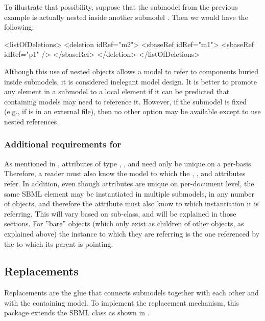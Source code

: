 To illustrate that possibility, suppose that the submodel  from
the previous example is actually nested inside another submodel
.  Then we would have the following:

\begin{example}
<listOfDeletions>
  <deletion idRef="m2">
    <sbaseRef idRef="m1">
      <sbaseRef idRef="p1" />
    </sbaseRef>
  </deletion>
</listOfDeletions>
\end{example}

Although this use of nested \SBaseRef objects allows a model to refer to
components buried inside submodels, it is considered inelegant model
design.  It is better to promote any element in a submodel to a local
element if it can be predicted that containing models may need to
reference it.  However, if the submodel is fixed (e.g., if is in an
external file), then no other option may be available except to use
nested references.

\subsubsection{Additional requirements for }

As mentioned in , attributes of type ,
, and  need only be unique on a
per-\Model basis.  Therefore, a reader must also know the model to which
the , , and  attributes
refer.  In addition, even though  attributes are unique
on per-document level, the same SBML element may be instantiated in
multiple submodels, in any number of \Model objects, and therefore the
 attribute must also know to which \Model instantiation
it is referring.  This will vary based on \SBaseRef sub-class, and will
be explained in those sections.  For ''bare'' \SBaseRef objects (which
only exist as children of other \SBaseRef objects, as explained above)
the \Model instance to which they are referring is the one referenced by
the \Submodel to which its parent is pointing.


\subsection{Replacements}
\label{replacements}
\label{extenced-sbase-class}

Replacements are the glue that connects submodels together with each
other and with the containing model.  To implement the replacement
mechanism, this package extends the SBML \SBase class as shown in
.

